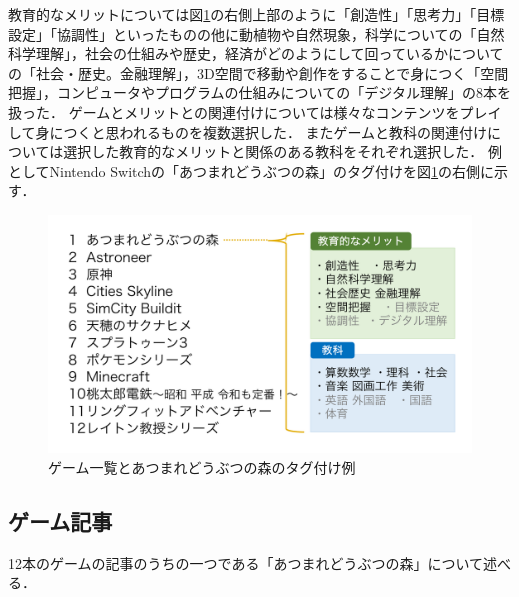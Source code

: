 \documentclass[12pt,a4j,titlepage]{ltjsarticle}
\begin{document}
教育的なメリットについては図\ref{fig:ゲーム一覧}の右側上部のように「創造性」「思考力」「目標設定」「協調性」といったものの他に動植物や自然現象，科学についての「自然科学理解」，社会の仕組みや歴史，経済がどのようにして回っているかについての「社会・歴史。金融理解」，3D空間で移動や創作をすることで身につく「空間把握」，コンピュータやプログラムの仕組みについての「デジタル理解」の8本を扱った．
ゲームとメリットとの関連付けについては様々なコンテンツをプレイして身につくと思われるものを複数選択した．
またゲームと教科の関連付けについては選択した教育的なメリットと関係のある教科をそれぞれ選択した．
例としてNintendo Switchの「あつまれどうぶつの森」のタグ付けを図\ref{fig:ゲーム一覧}の右側に示す．

\vspace{1zh}
\begin{figure}[H]
\begin{center}
 \includegraphics[keepaspectratio, scale=0.35]{PDF/games.pdf}
\end{center}
 \caption{ゲーム一覧とあつまれどうぶつの森のタグ付け例}
 \label{fig:ゲーム一覧}
\end{figure}

\newpage

\subsection{ゲーム記事}\label{ゲーム記事}
12本のゲームの記事のうちの一つである「あつまれどうぶつの森」について述べる．
\end{document}
